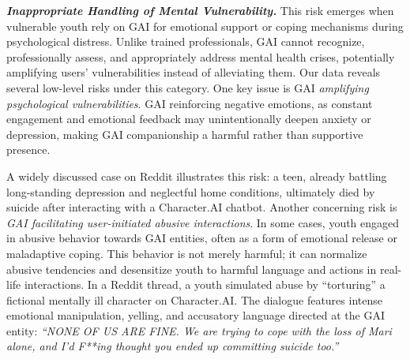 \textbf{\textit{Inappropriate Handling of Mental Vulnerability.}}
This risk emerges when vulnerable youth rely on GAI for emotional support or coping mechanisms during psychological distress. Unlike trained professionals, GAI cannot recognize, professionally assess, and appropriately address mental health crises, potentially amplifying users' vulnerabilities instead of alleviating them. Our data reveals several low-level risks under this category. One key issue is GAI \textit{amplifying psychological vulnerabilities}. GAI reinforcing negative emotions, as constant engagement and emotional feedback may unintentionally deepen anxiety or depression, making GAI companionship a harmful rather than supportive presence.

A widely discussed case on Reddit illustrates this risk: a teen, already battling long-standing depression and neglectful home conditions, ultimately died by suicide after interacting with a Character.AI chatbot. Another concerning risk is \textit{GAI facilitating user-initiated abusive interactions}. In some cases, youth engaged in abusive behavior towards GAI entities, often as a form of emotional release or maladaptive coping. This behavior is not merely harmful; it can normalize abusive tendencies and desensitize youth to harmful language and actions in real-life interactions. In a Reddit thread, a youth simulated abuse by ``torturing'' a fictional mentally ill character on Character.AI. The dialogue features intense emotional manipulation, yelling, and accusatory language directed at the GAI entity: \textit{``NONE OF US ARE FINE. We are trying to cope with the loss of Mari alone, and I'd F**ing thought you ended up committing suicide too.''}

